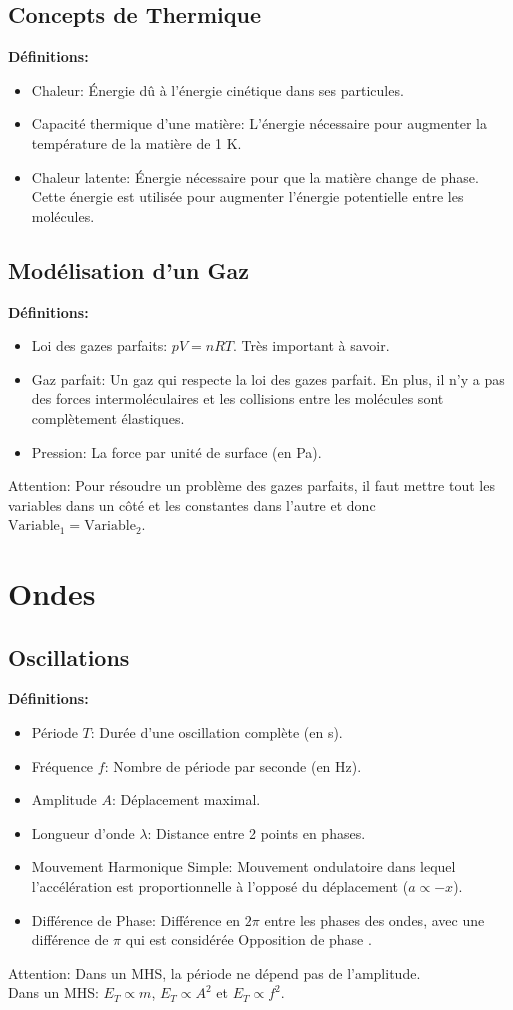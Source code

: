 \documentclass[french, a4paper, 12pt]{article}
\begin{document}
\subsection{Concepts de Thermique}
\textbf{Définitions:}
\begin{itemize}
\item Chaleur: Énergie dû à l'énergie cinétique dans ses particules.
\item Capacité thermique d'une matière: L'énergie nécessaire pour augmenter la température de la matière de 1 K.
\item Chaleur latente: Énergie nécessaire pour que la matière change de phase. Cette énergie est utilisée pour augmenter l'énergie potentielle entre les molécules.
\end{itemize}

\subsection{Modélisation d'un Gaz}
\textbf{Définitions:}
\begin{itemize}
\item Loi des gazes parfaits: $pV=nRT$. Très important à savoir.
\item Gaz parfait: Un gaz qui respecte la loi des gazes parfait. En plus, il n'y a pas des forces intermoléculaires et les collisions entre les molécules sont complètement élastiques.
\item Pression: La force par unité de surface (en \si{\pascal}).
\end{itemize}
Attention: Pour résoudre un problème des gazes parfaits, il faut mettre tout les variables dans un côté et les constantes dans l'autre et donc $\text{Variable}_1=\text{Variable}_2$.
\pagebreak

\section{Ondes}
\subsection{Oscillations}
\textbf{Définitions:}
\begin{itemize}
\item Période $T$: Durée d'une oscillation complète (en \si{\second}).
\item Fréquence $f$: Nombre de période par seconde (en \si{\hertz}).
\item Amplitude $A$: Déplacement maximal.
\item Longueur d'onde $\lambda$: Distance entre 2 points en phases.
\item Mouvement Harmonique Simple: Mouvement ondulatoire dans lequel l'accélération est proportionnelle à l'opposé du déplacement ($a\propto -x$).
\item Différence de Phase: Différence en $2\pi$ entre les phases des ondes, avec une différence de $\pi$ qui est considérée \og Opposition de phase \fg{}.
\end{itemize}
Attention: Dans un MHS, la période ne dépend pas de l'amplitude.\\
Dans un MHS: $E_T \propto m$, $E_T \propto A^2$ et $E_T \propto f^2$.
\end{document}
